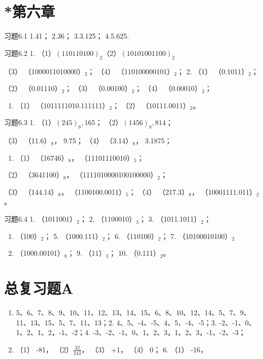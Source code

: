 \section{*第六章}

习题6.1 1.41； 2.36； 3.3.125； 4.5.625.

习题6.2 1. （1）\((110110100)_2\)（2）\((10101001100)_2\)

（3） （1000011010000）\(_{2}\)； （4） （110100000101）\(_{2}\)； 2.
（1） （0.1011）\(_{2}\)；

（2） （0.01110）\(_{2}\)； （3） （0.00100）\(_{2}\)； （4）
（0.00010）\(_{2}\)；

\begin{enumerate}[start=3]
\item
  （1） （1011111010.111111）\(_{2}\)； （2） （10111.0011）\(_{2}\)。
\end{enumerate}

习题6.3 1. （1）\((245)_8, 165\)； （2）\((1456)_8, 814\)；

（3） （11.6）\(_{8}\)， 9.75； （4） （3.14）\(_{8}\)， 3.1875；

\begin{enumerate}[start=2]
\item
  （1） （16746）\(_{8}\)， （11101110010）\(_{5}\)；
\end{enumerate}

（2） （3641100）\(_{8}\)， （1111010000100100000）\(_{2}\)；

（3） （144.14）\(_{8}\)， （1100100.0011）\(_{5}\)； （4）
（217.3）\(_{8}\)， （10001111.011）\(_{2}\)。

习题6.4 1. （1011001）\(_{2}\)； 2. （1100010）\(_{3}\)； 3.
（1011.1011）\(_{2}\)；

\begin{enumerate}[start=4]
\item
  （100）\(_{2}\)； 5. （1000.111）\(_{2}\)； 6. （110100）\(_{2}\)； 7.
  （10100010100）\(_{2}\)
\item
  （1000.00101）\(_{8}\)； 9. （11）\(_{3}\)； 10. （0.111）\(_{2}\)。
\end{enumerate}

\section{总复习题A}

\begin{enumerate}
\item
  5、6、7、8、9、10、11、12、13、14、15、6、8、10、12、14、5、7、9、11、13、15、5、7、11、13；2.
  4、5、-4、-5、4、5、-4、-5；3. -2、-1、0、1、2、1、2，-1、-2；4.
  -3、-2、-1、0、1、2、3，1、2、3，-1、-2、-3；
\item
  （1） -81， （2）\(\frac{32}{243}\)， （3） +1， （4） 0； 6. （1）
  -16，
\end{enumerate}

